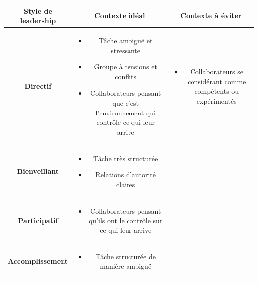 \documentclass[letterpaper, 12pt]{article}
\begin{document}
			\begin{longtable}{|c|c|c|}
				\hline
				\textbf{Style de leadership} & \textbf{Contexte idéal} & \textbf{Contexte à éviter}\\	
				\hline
				\begin{minipage}[t]{2cm}
					\medskip
					\centering
					\textbf{Directif}
					\medskip 
				\end{minipage}
				& 
				\begin{minipage}[t]{6.4cm}
					\medskip
					\begin{itemize}
						\item Tâche ambiguë et stressante
						\item Groupe à tensions et conflits
						\item Collaborateurs pensant que c'est l'environnement 
							qui contrôle ce qui leur arrive
					\end{itemize}
					\medskip
				\end{minipage}
				&
				\begin{minipage}[t]{6.4cm}
					\medskip
					\begin{itemize}
						\item Collaborateurs se considérant comme compétents ou expérimentés
					\end{itemize}
					\medskip
				\end{minipage}
				\\\hline
				\begin{minipage}[t]{2cm}
					\medskip
					\centering
					\textbf{Bienveillant}
					\medskip 
				\end{minipage}
				& 
				\begin{minipage}[t]{6.4cm}
					\medskip
					\begin{itemize}
						\item Tâche très structurée
						\item Relations d'autorité claires
					\end{itemize}
					\medskip
				\end{minipage}
				&\\\hline
				\begin{minipage}[t]{2cm}
					\medskip
					\centering
					\textbf{Participatif}
					\medskip 
				\end{minipage}
				& 
				\begin{minipage}[t]{6.4cm}
					\medskip
					\begin{itemize}
						\item Collaborateurs pensant qu'ils ont le contrôle
							sur ce qui leur arrive
					\end{itemize}
					\medskip
				\end{minipage}
				&
				\\\hline
				\textbf{Accomplissement}
				& 
				\begin{minipage}[t]{6.4cm}
					\medskip
					\begin{itemize}
						\item Tâche structurée de manière ambiguë
					\end{itemize}
					\medskip
				\end{minipage}
				&
				\\\hline
			\end{longtable}
\end{document}
